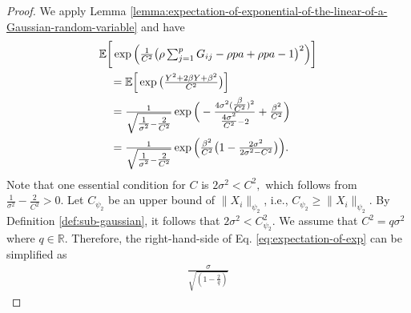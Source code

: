 \documentclass[lettersize,journal]{IEEEtran}
\newcommand{\RR}{\mathbb{R}}
\newcommand{\Cpsitwo}{C_{\psi_2}}
\newcommand{\psitwo}[1]{\|#1\|_{\psi_2} }
\begin{document}
{\begin{proof}
    We apply Lemma \ref{lemma:expectation-of-exponential-of-the-linear-of-a-Gaussian-random-variable} and have
    \begin{align}\label{eq:expectation-of-exp}  &\mathbb{E}\bigg[\exp{\Big(\tfrac{1}{C^2}\big(\rho\textstyle\sum_{j=1}^{p}G_{ij}-\rho pa+\rho pa-1\big)^2\Big)}\bigg] \notag\\ 
    & \quad=\mathbb{E}\Big[\exp{\big(\tfrac{Y^2+2\beta Y+\beta^2}{C^2}\big)}\Big]\notag\\
    &\quad =\tfrac{1}{\sqrt{\tfrac{1}{\sigma^2}-\tfrac{2}{C^2}}}\exp{\Big(-\tfrac{4\sigma^2 (\tfrac{\beta}{C^2})^2}{\tfrac{4\sigma^2}{C^2}-2} + \tfrac{\beta^2}{C^2} \Big)}\notag\\
     &\quad=\tfrac{1}{\sqrt{\tfrac{1}{\sigma^2}-\tfrac{2}{C^2}}}\exp{\Big(
    \tfrac{\beta^2}{C^2}\big(1-\tfrac{2\sigma^2}{2\sigma^2-C^2}\big)
     \Big)}.
    \end{align}%
    Note that one essential condition for $C$ is 
        $2\sigma^2 <C^2,$
     which follows from $\frac{1}{\sigma^2}-\frac{2}{C^2} >0$. 
    Let $\Cpsitwo$ be an upper bound of $\psitwo{X_i}$, i.e., 
    $\Cpsitwo \geq \psitwo{X_i}.$
    By Definition \ref{def:sub-gaussian}, it follows that
        $2\sigma^2<\Cpsitwo^2.$
     We assume that $C^2 = q \sigma^2$ where $q\in \RR$. Therefore, the right-hand-side of Eq. \eqref{eq:expectation-of-exp} can be simplified as
   \begin{align}
     \label{eq:simplified-expectation-of-exp}
        \tfrac{\sigma}{\sqrt{(1-\tfrac{2}{q})}}

\end{align}
\end{proof}}
\end{document}
